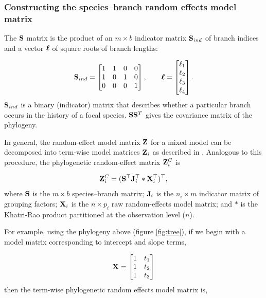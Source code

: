 \documentclass[12pt]{article}
\begin{document}
\subsubsection*{Constructing the species--branch random effects model matrix}

The ${\mathbf S}$ matrix is the product of an $m \times b$ indicator matrix ${\mathbf S}_{ind}$ of branch indices and a vector ${\boldsymbol \ell}$ of square roots of branch lengths:

\[
{\mathbf S}_{ind} = \begin{bmatrix}
1 & 1 & 0 & 0 \\ 
1 & 0 & 1 & 0 \\ 
0 & 0 & 0 & 1
\end{bmatrix} , 
\qquad
{\boldsymbol \ell} = \begin{bmatrix}
\ell_1 \\
\ell_2 \\
\ell_3 \\
\ell_4 
\end{bmatrix} .
\]
${\mathbf S}_{ind}$ is a binary (indicator) matrix that describes whether a particular branch occurs in the history of a focal species. 
${\mathbf S} {\mathbf S}^T$ gives the covariance matrix of the phylogeny. 

In general, the random-effect model matrix ${\mathbf Z}$ for a mixed model can be decomposed into term-wise model matrices ${\mathbf Z}_{i}$ as described in \citet{bates2015fitting}.
Analogous to this procedure, the phylogenetic random-effect matrix ${\mathbf Z}^{C}_{i}$ is

\begin{equation}
{\mathbf Z}^{C}_{i} = ({\mathbf S}^{\top}{\mathbf J}^{\top}_{i} \ast {\mathbf X}^{\top}_{i})^{\top}, \label{eq:ZC}
\end{equation}
where ${\mathbf S}$ is the $m \times b$ species--branch matrix; ${\mathbf J}_{i}$ is the $n_i \times m$ indicator matrix of grouping factors; ${\mathbf X}_{i}$ is the $n \times p_{i}$ raw random-effects model matrix; and $\ast$ is the Khatri-Rao product \citep{khatri1968solutions} partitioned at the observation level ($n$).

For example, using the phylogeny above (figure \ref{fig:tree}), if we begin with a model matrix corresponding to intercept and slope terms, 

\[
{\mathbf X} = \begin{bmatrix}
1 & t_1  \\ 
1 & t_2  \\ 
1 & t_3 
\end{bmatrix} 
\]
then the term-wise phylogenetic random effects model matrix is,
\end{document}
